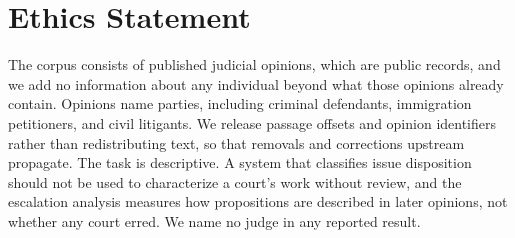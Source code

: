 \documentclass[11pt]{article}
\begin{document}


\section*{Ethics Statement}

The corpus consists of published judicial opinions, which are public records, and
we add no information about any individual beyond what those opinions already
contain. Opinions name parties, including criminal defendants, immigration
petitioners, and civil litigants. We release passage offsets and opinion
identifiers rather than redistributing text, so that removals and corrections
upstream propagate. The task is descriptive. A system that classifies issue
disposition should not be used to characterize a court's work without review, and
the escalation analysis measures how propositions are described in later
opinions, not whether any court erred. We name no judge in any reported result.




\appendix

\end{document}
